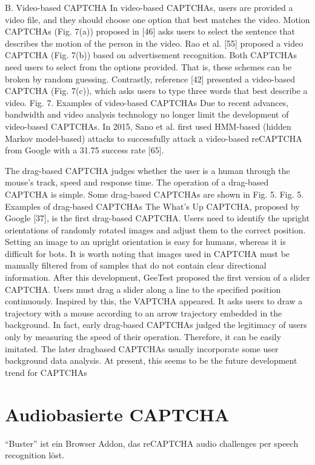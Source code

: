 B. Video-based CAPTCHA
In video-based CAPTCHAs, users are provided a video
file, and they should choose one option that best matches the
video. Motion CAPTCHAs (Fig. 7(a)) proposed in [46] asks
users to select the sentence that describes the motion of the
person in the video. Rao et al. [55] proposed a video
CAPTCHA (Fig. 7(b)) based on advertisement recognition.
Both CAPTCHAs need users to select from the options
provided. That is, these schemes can be broken by random
guessing. Contrastly, reference [42] presented a video-based
CAPTCHA (Fig. 7(c)), which asks users to type three words
that best describe a video.
Fig. 7. Examples of video-based CAPTCHAs
Due to recent advances, bandwidth and video analysis
technology no longer limit the development of video-based
CAPTCHAs. In 2015, Sano et al. first used HMM-based
(hidden Markov model-based) attacks to successfully attack a
video-based reCAPTCHA from Google with a 31.75%
success rate [65]. 

The drag-based CAPTCHA judges whether the user is a
human through the mouse’s track, speed and response time.
The operation of a drag-based CAPTCHA is simple. Some
drag-based CAPTCHAs are shown in Fig. 5.
Fig. 5. Examples of drag-based CAPTCHAs
The What’s Up CAPTCHA, proposed by Google [37], is
the first drag-based CAPTCHA. Users need to identify the
upright orientations of randomly rotated images and adjust
them to the correct position. Setting an image to an upright
orientation is easy for humans, whereas it is difficult for bots.
It is worth noting that images used in CAPTCHA must be
manually filtered from of samples that do not contain clear
directional information. After this development, GeeTest
proposed the first version of a slider CAPTCHA. Users must
drag a slider along a line to the specified position
continuously. Inspired by this, the VAPTCHA appeared. It
asks users to draw a trajectory with a mouse according to an
arrow trajectory embedded in the background.
In fact, early drag-based CAPTCHAs judged the
legitimacy of users only by measuring the speed of their
operation. Therefore, it can be easily imitated. The later dragbased CAPTCHAs usually incorporate some user background
data analysis. At present, this seems to be the future
development trend for CAPTCHAs

\section{Audiobasierte CAPTCHA}

“Buster” ist ein Browser Addon, das reCAPTCHA audio challenges per speech recognition löst.


